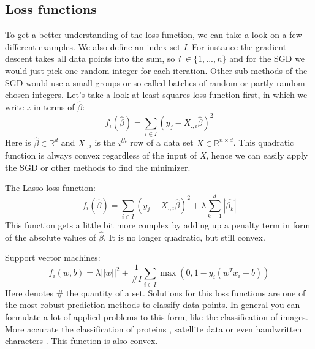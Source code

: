 \documentclass{article}
\begin{document}
\subsection{Loss functions}
To get a better understanding of the loss function, we can take a look on a few different examples.  We also define an index set \textit{I}. For instance the gradient descent takes all data points into the sum, so \textit{i} \begin{math}\in \{1,...,n\}\end{math}  and for the SGD we would just pick one random integer for each iteration. Other sub-methods of the SGD would use a small groups or so called batches of random or partly random chosen integers.
Let's take a look at least-squares loss function first, in which we write \textit{x} in terms of \(\hat{\beta}\): 
\begin{equation}\label{eq:2}
f_i(\hat{\beta}) = \sum_{i \in I}(y_j - X_{.,i}\hat{\beta})^2
\end{equation}
Here is \( \hat{\beta} \in \mathbb{R}^d \) and \( X_{.,i} \) is the \(i^{th} \) row of a data set \( X \in \mathbb{R}^{n\times d} \). This quadratic function is always convex regardless of the input of \textit{X},  hence we can easily apply the SGD or other methods to find the minimizer.

The Lasso loss function:
\begin{equation} 
f_i(\hat{\beta}) = \sum_{i \in I}(y_j - X_{.,i}\hat{\beta})^2 + \lambda \sum_{k=1}^d|\hat{\beta_k}|
\end{equation}
This function gets a little bit more complex by adding up a penalty term in form of the absolute values of \(\hat{\beta}\). It is no longer quadratic, but still convex.

Support vector machines: 
\begin{equation} 
f_i(w,b) = \lambda||w||^2+\frac{1}{\#I}\sum_{i \in I} \max(0,1-y_i(w^Tx_i-b))
\end{equation}
Here denotes \# the quantity of a set. Solutions for this loss functions are one of the most robust prediction methods to classify data points. In general you can formulate a lot of applied problems to this form, like the classification of images. More accurate the classification of proteins \cite{Gaonkar}, satellite data \cite{maity2016supervised} or even handwritten characters \cite{7333916} \cite{Dennis}. 
This function is also convex.
\end{document}
